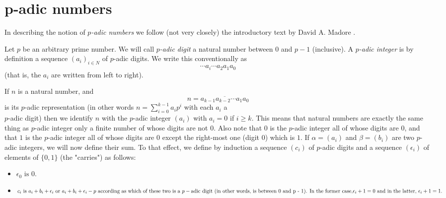 \documentclass{llncs}
\begin{document}
\section{p-adic numbers} 

In describing the notion of {\em $p$-adic numbers} we follow (not very closely) the introductory text by David A. Madore \cite{M00}. 

Let $p$ be an arbitrary prime number.
We will call {\em $p$-adic digit} a natural number between $0$ and $p-1$ (inclusive). A
{\em $p$-adic integer} is by definition a sequence $(a_i)_{i \in N}$ of $p$-adic digits. We write this
conventionally as
$$
\cdots a_i \cdots  a_2 a_1 a_0
$$
(that is, the $a_i$ are written from left to right).

If $n$ is a natural number, and
$$
n = \overline{a_{k-1} a_{k-2} \cdots  a_1 a_0}
$$
is its $p$-adic representation (in other words 
$n = \sum ^{k-1}_{i=0}  a_ip^i$ with each $a_i$ a\\ $p$-adic
digit) then we identify $n$ with the $p$-adic integer $(a_i)$ with $a_i = 0$ if $i \geq k$. This
means that natural numbers are exactly the same thing as $p$-adic integer only a
finite number of whose digits are not $0$. Also note that $0$ is the $p$-adic integer all of
whose digits are $0$, and that $1$ is the $p$-adic integer all of whose digits are $0$ except
the right-most one (digit $0$) which is $1$.
If $\alpha  = (a_i)$ and $\beta = (b_i)$ are two $p$-adic integers, we will now define their
sum. To that effect, we define by induction a sequence $(c_i)$ of $p$-adic digits and a
sequence $(\epsilon _i)$ of elements of $\{0, 1\}$ (the "carries") as follows:\\


\begin{itemize}
  \item  $\epsilon _0 \mbox{ is } 0.$\\
  \item  $c_i \mbox{ is } a_i + b_i + \epsilon _i \mbox{ or } a_i + b_i + \epsilon _i - p \mbox{ according as which of these two is a }\\
p-\mbox{adic digit (in other words, is between 0 and p - 1). In the former case,}\\
\epsilon _i+1 = 0 \mbox{ and in the latter, } \epsilon _i+1 = 1.$
\end{itemize}
\end{document}
